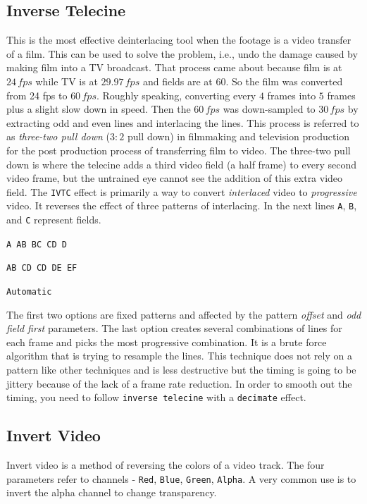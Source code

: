 \subsection{Inverse Telecine}%
\label{sub:inverse_telecine}

This is the most effective deinterlacing tool when the footage is a video transfer of a film. This can be used to solve the problem, i.e., undo the damage caused by making film into a TV broadcast. That process came about because film is at $24\,fps$ while TV is at $29.97\,fps$ and fields are at $60$. So the film was converted from 24 fps to $60\,fps$. Roughly speaking, converting every $4$ frames into $5$ frames plus a slight slow down in speed. Then the $60\,fps$ was down-sampled to $30\,fps$ by extracting odd and even lines and interlacing the lines. This process is referred to as \textit{three-two pull down} ($3:2$ pull down) in filmmaking and television production for the post production process of transferring film to video.
The three-two pull down is where the telecine adds a third video field (a half frame) to every second video frame, but the untrained eye cannot see the addition of this extra video field.
The \texttt{IVTC} effect is primarily a way to convert \textit{interlaced} video to \textit{progressive} video. It reverses the effect of three patterns of interlacing. In the next lines \texttt{A}, \texttt{B}, and \texttt{C} represent fields.

\texttt{A AB BC CD D}
 
\texttt{AB CD CD DE EF} 

\texttt{Automatic}

The first two options are fixed patterns and affected by the pattern \textit{offset} and \textit{odd field first} parameters. The last option creates several combinations of lines for each frame and picks the most progressive combination. It is a brute force algorithm that is trying to resample the lines. This technique does not rely on a pattern like other techniques and is less destructive but the timing is going to be jittery because of the lack of a frame rate reduction. In order to smooth out the timing, you need to follow \texttt{inverse telecine} with a \texttt{decimate} effect.

\subsection{Invert Video}%
\label{sub:invert_video}

Invert video is a method of reversing the colors of a video track. The four parameters refer to channels - \texttt{Red}, \texttt{Blue}, \texttt{Green}, \texttt{Alpha}. A very common use is to invert the alpha channel to change transparency.

